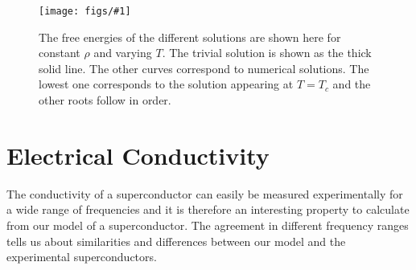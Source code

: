\documentclass[12pt]{report}
\newcommand{\fig}[2]{
\begin{figure}
\centering
\texttt{[image: figs/\#1]}
\caption{#2}
\end{figure}
}
\begin{document}
\fig{A_constRho_a2_0.0.pdf}{The free energies of the different solutions are shown here for constant $\rho$ and varying $T$. The trivial solution is shown as the thick solid line. The other curves correspond to numerical solutions. The lowest one corresponds to the solution appearing at $T=T_c$ and the other roots follow in order.\label{f:A}}

\section{Electrical Conductivity}
The conductivity of a superconductor can easily be measured experimentally for a wide range of frequencies and it is therefore an interesting property to calculate from our model of a superconductor. The agreement in different frequency ranges tells us about similarities and differences between our model and the experimental superconductors.\\
\end{document}

